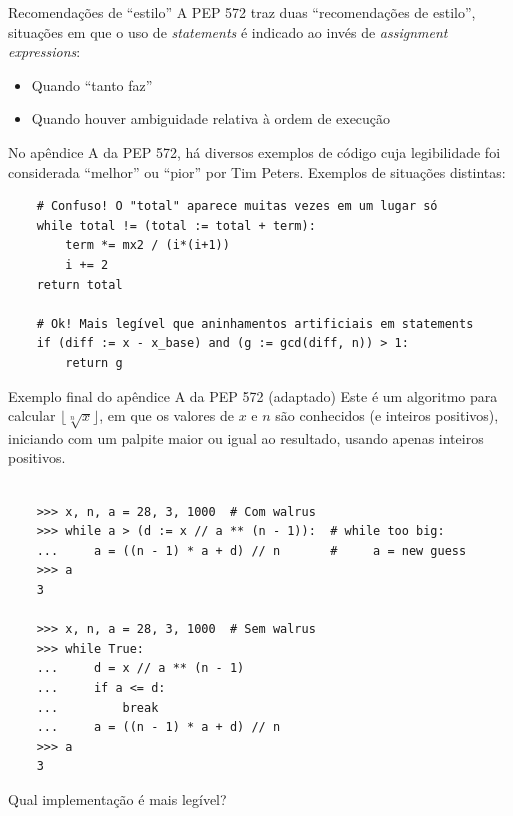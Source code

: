 \documentclass[utf8]{beamer}
\begin{document}
\begin{frame}[fragile]{Recomendações de ``estilo''}
  A PEP 572 traz duas ``recomendações de estilo'',
  situações em que o uso de \emph{statements}
  é indicado ao invés de \emph{assignment expressions}:
  \vfill
  \begin{itemize}
    \item Quando ``tanto faz''
    \item Quando houver ambiguidade relativa à ordem de execução
  \end{itemize}
  \vfill
  No apêndice A da PEP 572,
  há diversos exemplos de código
  cuja legibilidade foi considerada ``melhor'' ou ``pior''
  por Tim Peters.
  Exemplos de situações distintas:
  \begin{verbatim}
    # Confuso! O "total" aparece muitas vezes em um lugar só
    while total != (total := total + term):
        term *= mx2 / (i*(i+1))
        i += 2
    return total

    # Ok! Mais legível que aninhamentos artificiais em statements
    if (diff := x - x_base) and (g := gcd(diff, n)) > 1:
        return g
  \end{verbatim}
\end{frame}


\begin{frame}[fragile]{Exemplo final do apêndice A da PEP 572
                       (adaptado)}
  Este é um algoritmo para calcular $\lfloor \sqrt[n]{x} \rfloor$,
  em que os valores de $x$ e $n$ são conhecidos (e inteiros positivos),
  iniciando com um palpite maior ou igual ao resultado,
  usando apenas inteiros positivos.
  \vfill
  \begin{verbatim}

    >>> x, n, a = 28, 3, 1000  # Com walrus
    >>> while a > (d := x // a ** (n - 1)):  # while too big:
    ...     a = ((n - 1) * a + d) // n       #     a = new guess
    >>> a
    3

    >>> x, n, a = 28, 3, 1000  # Sem walrus
    >>> while True:
    ...     d = x // a ** (n - 1)
    ...     if a <= d:
    ...         break
    ...     a = ((n - 1) * a + d) // n
    >>> a
    3

  \end{verbatim}
  \vfill
  Qual implementação é mais legível?
\end{frame}
\end{document}

